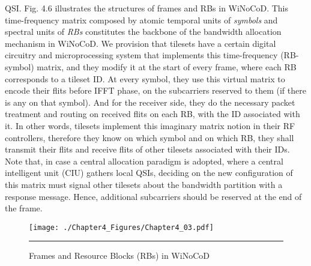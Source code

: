 QSI. Fig. 4.6 illustrates the structures of frames and RBs in WiNoCoD. This time-frequency matrix composed by atomic temporal units of \textit{symbols} and spectral units of \textit{RBs} constitutes the backbone of the bandwidth allocation mechanism in WiNoCoD. We provision that tilesets have a certain digital circuitry and microprocessing system that implements this time-frequency (RB-symbol) matrix, and they modify it at the start of every frame, where each RB corresponds to a tileset ID. At every symbol, they use this virtual matrix to encode their flits before IFFT phase, on the subcarriers reserved to them (if there is any on that symbol). And for the receiver side, they do the necessary packet treatment and routing on received flits on each RB, with the ID associated with it. In other words, tilesets implement this imaginary matrix notion in their RF controllers, therefore they know on which symbol and on which RB, they shall transmit their flits and receive flits of other tilesets associated with their IDs. Note that, in case a central allocation paradigm is adopted, where a central intelligent unit (CIU) gathers local QSIs, deciding on the new configuration of this matrix must signal other tilesets about the bandwidth partition with a response message. Hence, additional subcarriers should be reserved at the end of the frame.

\begin{figure}[htbp]
  \centering
    \texttt{[image: ./Chapter4\_Figures/Chapter4\_03.pdf]}
    \rule{35em}{0.5pt}
  \caption[Frames and Resource Blocks (RBs) in WiNoCoD]{Frames and Resource Blocks (RBs) in WiNoCoD} 
  \label{fig:Electron}
\end{figure}

